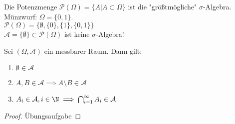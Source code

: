 \begin{example}

Die Potenzmenge $\mathcal{P}(\Omega)= \{A | A \subset \Omega\} $ ist die "größtmögliche" $\sigma$-Algebra. \\
Münzwurf: $\Omega= \{0,1\}$. \\
$\mathcal{P}(\Omega) = \{\emptyset, \{0\} , \{1\} ,\{0,1\} \} $\\
$\mathcal{A} = \{\emptyset\} \subset \mathcal{P}(\Omega)$ ist keine $\sigma$-Algebra!
\end{example}
\begin{corollary}
	Sei $(\Omega, \mathcal{A})$ ein messbarer Raum. Dann gilt:
	\begin{enumerate}
		\item $\emptyset \in \mathcal{A}$
		\item $A,B \in \mathcal{A} \implies A \setminus B \in \mathcal{A}$
		\item $A_i \in \mathcal{A}, i \in \N \implies \bigcap_{i=1}^{\infty} A_i \in \mathcal{A}$ 
	\end{enumerate}

\end{corollary}
\begin{proof}
Übungsaufgabe
\end{proof}

